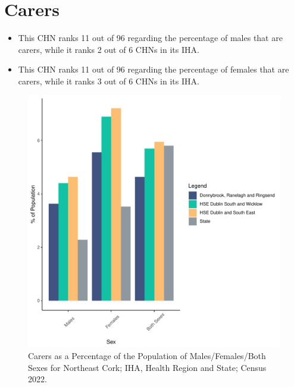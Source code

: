 \documentclass{article}
\begin{document}
\section{Carers}\label{sect:Carers}
\begin{itemize}
\item This CHN ranks  11 out of 96 regarding the percentage of males that are carers, while it ranks   2 out of 6 CHNs in its IHA.
\item This CHN ranks  11 out of 96 regarding the percentage of females that are carers, while it ranks   3 out of 6 CHNs in its IHA.
\end{itemize}
\begin{figure}[H]
	\centering
	\includegraphics[width = 150mm]{../figures/CareED.pdf}
	\caption{Carers as a Percentage of the Population of Males/Females/Both Sexes for Northeast Cork; IHA, Health Region and State; Census 2022.}
	\label{fig:2ae19629-1a6a-13a3-e055-000000000001}
	\end{figure}
\end{document}
